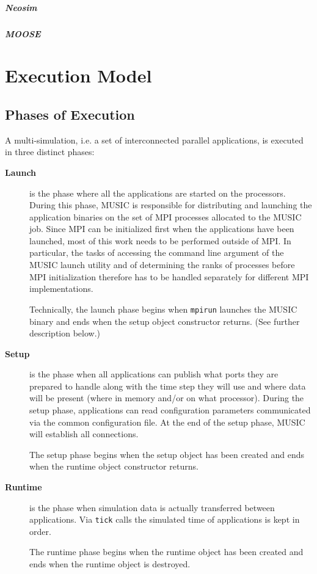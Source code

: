 \documentclass[a4paper,twoside]{report}
\begin{document}
\begin{metatext}
\paragraph{Neosim}

\paragraph{MOOSE}
\end{metatext}

\chapter{Execution Model}

\section{Phases of Execution}

A multi-simulation, i.e. a set of interconnected parallel
applications, is executed in three distinct phases:
\begin{description}
\item[\textbf{Launch}] is the phase where all the
  applications are started on the processors.  During this phase,
  MUSIC is responsible for distributing and launching the application
  binaries on the set of MPI processes allocated to the MUSIC job.
  Since MPI can be initialized first when the applications have been
  launched, most of this work needs to be performed outside of MPI.
  In particular, the tasks of accessing the command line argument of
  the MUSIC launch utility and of determining the ranks of processes
  before MPI initialization therefore has to be handled separately for
  different MPI implementations.

  Technically, the launch phase begins when \texttt{mpirun} launches
  the MUSIC binary and ends when the setup object constructor
  returns.  (See further description below.)

\item[\textbf{Setup}] is the phase when all
  applications can publish what ports they are prepared to handle
  along with the time step they will use and where data will be
  present (where in memory and/or on what processor).  During the
  setup phase, applications can read configuration parameters
  communicated via the common configuration file.  At the end of the
  setup phase, MUSIC will establish all connections.

  The setup phase begins when the setup object has been created and
  ends when the runtime object constructor returns.

\item[\textbf{Runtime}] is the phase when
  simulation data is actually transferred between applications.  Via
  \texttt{tick} calls the simulated time of applications is
  kept in order.

  The runtime phase begins when the runtime object has been created
  and ends when the runtime object is destroyed.
\end{description}
\end{document}
